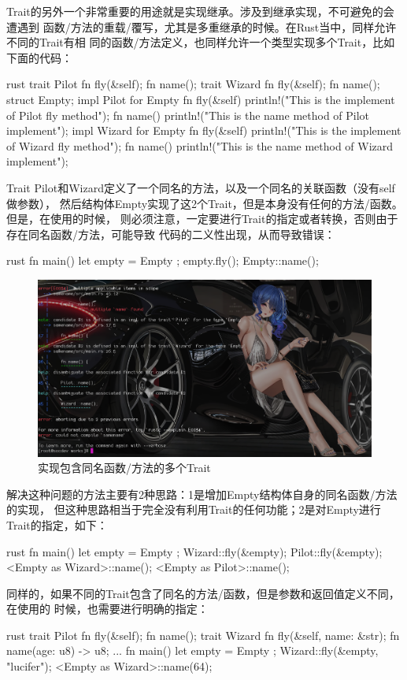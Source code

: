Trait的另外一个非常重要的用途就是实现继承。涉及到继承实现，不可避免的会遭遇到
函数/方法的重载/覆写，尤其是多重继承的时候。在Rust当中，同样允许不同的Trait有相
同的函数/方法定义，也同样允许一个类型实现多个Trait，比如下面的代码：
\begin{code-block}{rust}
trait Pilot {
    fn fly(&self);
    fn name();
}
trait Wizard {
    fn fly(&self);
    fn name();
}
struct Empty;
impl Pilot for Empty {
    fn fly(&self) {
        println!("This is the implement of Pilot fly method");
    }
    fn name() {
        println!("This is the name method of Pilot implement");
    }
}
impl Wizard for Empty {
    fn fly(&self) {
        println!("This is the implement of Wizard fly method");
    }
    fn name() {
        println!("This is the name method of Wizard implement");
    }
}
\end{code-block}
Trait Pilot和Wizard定义了一个同名的方法，以及一个同名的关联函数（没有self做参数），
然后结构体Empty实现了这2个Trait，但是本身没有任何的方法/函数。但是，在使用的时候，
则必须注意，一定要进行Trait的指定或者转换，否则由于存在同名函数/方法，可能导致
代码的二义性出现，从而导致错误：
\begin{code-block}{rust}
fn main() {
    let empty = Empty {};
    empty.fly();
    Empty::name();
}
\end{code-block}
\begin{figure}[H]
  \centering
  \includegraphics[width=\linewidth]{rust_same_name.png}
  \caption{实现包含同名函数/方法的多个Trait}
  \label{fig:rust_same_name}
\end{figure}
解决这种问题的方法主要有2种思路：1是增加Empty结构体自身的同名函数/方法的实现，
但这种思路相当于完全没有利用Trait的任何功能；2是对Empty进行Trait的指定，如下：
\begin{code-block}{rust}
fn main() {
    let empty = Empty {};
    Wizard::fly(&empty);
    Pilot::fly(&empty);
    <Empty as Wizard>::name();
    <Empty as Pilot>::name();
}
\end{code-block}
同样的，如果不同的Trait包含了同名的方法/函数，但是参数和返回值定义不同，在使用的
时候，也需要进行明确的指定：
\begin{code-block}{rust}
trait Pilot {
    fn fly(&self);
    fn name();
}
trait Wizard {
    fn fly(&self, name: &str);
    fn name(age: u8) -> u8;
}
...
fn main() {
    let empty = Empty {};
    Wizard::fly(&empty, "lucifer");
    <Empty as Wizard>::name(64);
}
\end{code-block}

